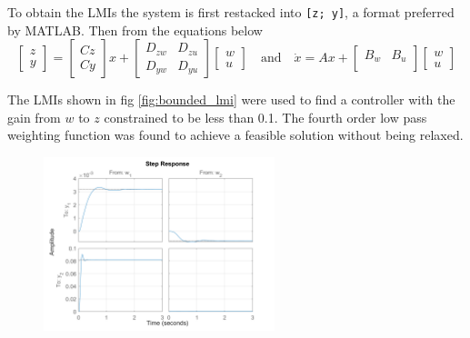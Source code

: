 \documentclass{article}
\begin{document}
To obtain the LMIs the system is first restacked into \texttt{[z; y]}, a format preferred by MATLAB.
Then from the equations below
\begin{equation}
    \begin{bmatrix}
        z \\
        y
    \end{bmatrix} = \begin{bmatrix}
        Cz \\
        Cy
    \end{bmatrix} x + \begin{bmatrix}
        D_{zw} & D_{zu} \\
        D_{yw} & D_{yu}
    \end{bmatrix} \begin{bmatrix}
        w \\
        u
    \end{bmatrix} \quad \text{and} \quad \dot{x} = Ax + \begin{bmatrix}
        B_w & B_u \\
    \end{bmatrix} \begin{bmatrix}
        w \\
        u
    \end{bmatrix}
\end{equation}

The LMIs shown in fig \ref{fig:bounded_lmi} were used to find a controller with the gain from $w$ to $z$ constrained to be less than 0.1.
The fourth order low pass weighting function was found to achieve a feasible solution without being relaxed.

\begin{figure}[H]
    \centering
    \includegraphics[width=0.6\textwidth]{figures/K_g_step.png}
    \caption{}
\end{figure}
\end{document}
